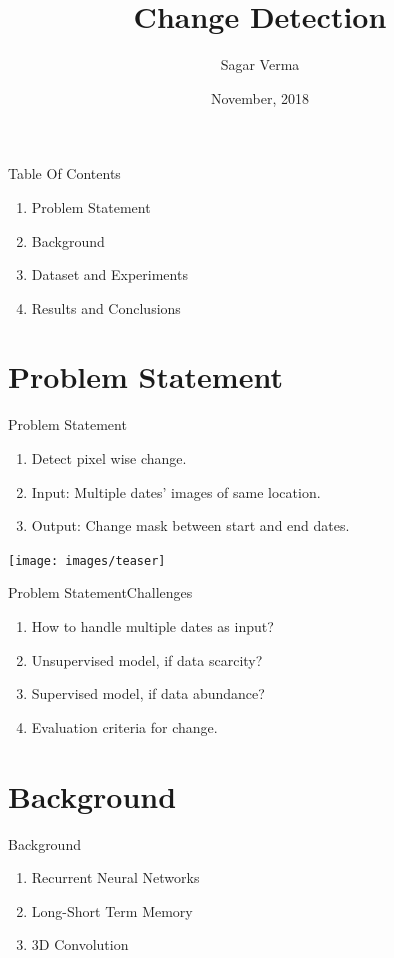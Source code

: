 \documentclass[handout]{beamer}
\title[ \insertdate]{Change Detection}
\author{Sagar Verma}
\institute[Granular AI] %
{
24 Stony Brook Road
Belmont MA, 02478 USA}
\date{November, 2018}
\begin{document}
\begin{frame}
\titlepage
\end{frame}

\begin{frame}{Table Of Contents}
\begin{enumerate}
\item Problem Statement
\item Background
\item Dataset and Experiments
\item Results and Conclusions
\end{enumerate}
\end{frame}

\section{Problem Statement}

\begin{frame}{Problem Statement}
\begin{center}
\begin{enumerate}
  \item Detect pixel wise change.
  \item Input: Multiple dates' images of same location.
  \item Output: Change mask between start and end dates.
\end{enumerate}
\vspace{.5cm}
\texttt{[image: images/teaser]}
\end{center}
\end{frame}


\begin{frame}{Problem Statement}{Challenges}
  \begin{enumerate}
    \item How to handle multiple dates as input?
    \item Unsupervised model, if data scarcity?
    \item Supervised model, if data abundance?
    \item Evaluation criteria for change.
  \end{enumerate}
\end{frame}

\section{Background}
\begin{frame}{Background}
  \begin{enumerate}
    \item Recurrent Neural Networks
    \item Long-Short Term Memory
    \item 3D Convolution
  \end{enumerate}
\end{frame}
\end{document}
